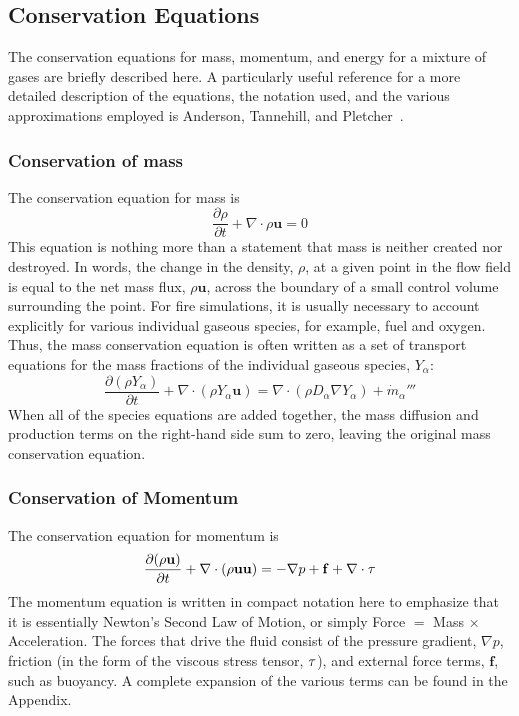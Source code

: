 \documentclass[graybox]{svmult}
\begin{document}
\subsection{Conservation Equations}

The conservation equations for mass, momentum, and energy for a mixture of gases are briefly described here. A particularly useful reference for a more detailed description of the equations, the notation used, and the various approximations employed is Anderson, Tannehill, and Pletcher~\cite{Anderson}.

\subsubsection{Conservation of mass}

The conservation equation for mass is
\begin{equation}
\frac{\partial \rho}{\partial t} + \nabla \cdot \rho \mathbf{u} = 0
\label{eq:masscon}
\end{equation}
This equation is nothing more than a statement that mass is neither created nor destroyed. In words, the change in the density, $\rho$, at a given point in the flow field is equal to the net mass flux, $\rho \mathbf{u}$, across the boundary of a small control volume surrounding the point. For fire simulations, it is usually necessary to account explicitly for various individual gaseous species, for example, fuel and oxygen. Thus, the mass conservation equation is often written as a set of transport equations for the mass fractions of the individual gaseous species, $Y_\alpha$:
\begin{equation}
\frac{\partial (\rho Y_\alpha)}{\partial t} + \nabla \cdot (\rho Y_\alpha \mathbf{u}) = \nabla \cdot \left( \rho D_\alpha \nabla Y_\alpha \right) + \dot{m}_\alpha'''
\label{eq:speccon}
\end{equation}
When all of the species equations are added together, the mass diffusion and production terms on the right-hand side sum to zero, leaving the original mass conservation equation.

\subsubsection{Conservation of Momentum}

The conservation equation for momentum is
\begin{equation}
\frac{\partial (\rho \mathbf{u})}{\partial t} + \nabla \cdot (\rho \mathbf{u} \mathbf{u}) = -\nabla p + \mathbf{f} + \nabla \cdot \tens{\tau}
\label{eq:momcon}
\end{equation}
The momentum equation is written in compact notation here to emphasize that it is essentially Newton's Second Law of Motion, or simply Force $=$ Mass $\times$ Acceleration. The forces that drive the fluid consist of the pressure gradient, $\nabla p$, friction (in the form of the viscous stress tensor, $\tens{\tau}$), and external force terms, $\mathbf{f}$, such as buoyancy. A complete expansion of the various terms can be found in the Appendix.
\end{document}
